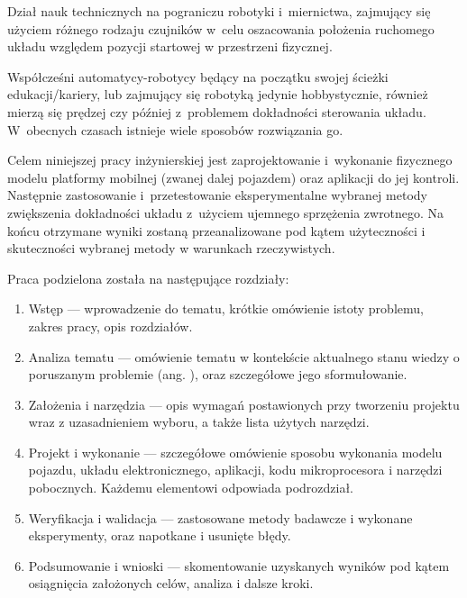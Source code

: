 \begin{Definition}[Odometria]\label{def:odometria}
    Dział nauk technicznych na pograniczu robotyki i~miernictwa, zajmujący się użyciem różnego rodzaju czujników w~celu oszacowania położenia ruchomego układu względem pozycji startowej w przestrzeni fizycznej.
\end{Definition}

Współcześni automatycy-robotycy będący na początku swojej ścieżki edukacji/kariery, lub zajmujący się robotyką jedynie hobbystycznie, również mierzą się prędzej czy później z~problemem dokładności sterowania układu. W~obecnych czasach istnieje wiele sposobów rozwiązania go.

Celem niniejszej pracy inżynierskiej jest zaprojektowanie i~wykonanie fizycznego modelu platformy mobilnej (zwanej dalej pojazdem) oraz aplikacji do jej kontroli. Następnie zastosowanie i~przetestowanie eksperymentalne wybranej metody zwiększenia dokładności układu z~użyciem ujemnego sprzężenia zwrotnego. Na końcu otrzymane wyniki zostaną przeanalizowane pod kątem użyteczności i skuteczności wybranej metody w warunkach rzeczywistych.

Praca podzielona została na następujące rozdziały\cite{bib:wymaganiapracy}:
\begin{enumerate}
    \item Wstęp --- wprowadzenie do tematu, krótkie omówienie istoty problemu, zakres pracy, opis rozdziałów.
    \item Analiza tematu --- omówienie tematu w kontekście aktualnego stanu wiedzy o poruszanym problemie (ang. ), oraz szczegółowe jego sformułowanie.
    \item Założenia i narzędzia --- opis wymagań postawionych przy tworzeniu projektu wraz z uzasadnieniem wyboru, a także lista użytych narzędzi.
    \item Projekt i wykonanie --- szczegółowe omówienie sposobu wykonania modelu pojazdu, układu elektronicznego, aplikacji, kodu mikroprocesora i narzędzi pobocznych. Każdemu elementowi odpowiada podrozdział.
    \item Weryfikacja i walidacja --- zastosowane metody badawcze i wykonane eksperymenty, oraz napotkane i usunięte błędy.
    \item Podsumowanie i wnioski --- skomentowanie uzyskanych wyników pod kątem osiągnięcia założonych celów, analiza i dalsze kroki.
\end{enumerate}